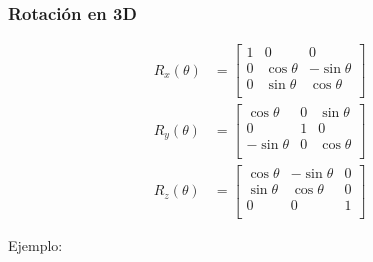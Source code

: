 \begin{frame}
    \frametitle{Rotación en 3D}
    \small
    \begin{equation*}
        {\displaystyle {\begin{alignedat}{1}R_{x}(\theta )&={\begin{bmatrix}1&0&0\\0&\cos \theta &-\sin \theta \\[3pt]0&\sin \theta     &\cos \theta \\[3pt]\end{bmatrix}}\\
                    R_{y}(\theta )&={\begin{bmatrix}\cos \theta &0&\sin \theta \\[3pt]0&1&0\\[3pt]-\sin \theta &0&\cos \theta \\
                    \end{bmatrix}}\\
                    R_{z}(\theta )&={\begin{bmatrix}\cos \theta &-\sin \theta &0\\[3pt]\sin \theta &\cos \theta &0\\[3pt]0&0&1\\\end{bmatrix}}\end{alignedat}}
        }
    \end{equation*}

    Ejemplo:


\end{frame}
